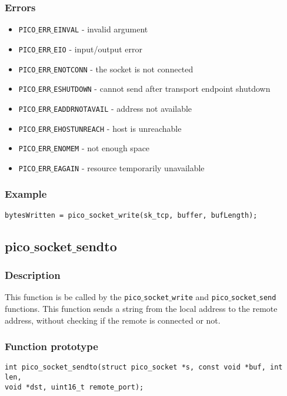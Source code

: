 \subsubsection*{Errors}
\begin{itemize}[noitemsep]
\item \texttt{PICO$\_$ERR$\_$EINVAL} - invalid argument
\item \texttt{PICO$\_$ERR$\_$EIO} - input/output error
\item \texttt{PICO$\_$ERR$\_$ENOTCONN} - the socket is not connected
\item \texttt{PICO$\_$ERR$\_$ESHUTDOWN} - cannot send after transport endpoint shutdown
\item \texttt{PICO$\_$ERR$\_$EADDRNOTAVAIL} - address not available
\item \texttt{PICO$\_$ERR$\_$EHOSTUNREACH} - host is unreachable
\item \texttt{PICO$\_$ERR$\_$ENOMEM} - not enough space
\item \texttt{PICO$\_$ERR$\_$EAGAIN} - resource temporarily unavailable
\end{itemize}

\subsubsection*{Example}
\begin{verbatim}
bytesWritten = pico_socket_write(sk_tcp, buffer, bufLength);
\end{verbatim}


\subsection{pico$\_$socket$\_$sendto}

\subsubsection*{Description}
This function is be called by the \texttt{pico$\_$socket$\_$write} and \texttt{pico$\_$socket$\_$send} functions.
This function sends a string from the local address to the remote address, without checking
if the remote is connected or not.

\subsubsection*{Function prototype}
\begin{verbatim}
int pico_socket_sendto(struct pico_socket *s, const void *buf, int len,
void *dst, uint16_t remote_port);
\end{verbatim}

